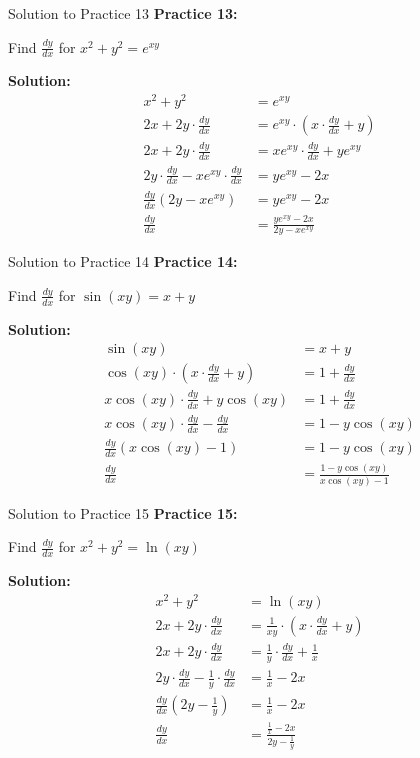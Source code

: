 \documentclass[aspectratio=169]{beamer}
\begin{document}
\begin{frame}{Solution to Practice 13}
\textbf{Practice 13:}

Find $\frac{dy}{dx}$ for $x^2 + y^2 = e^{xy}$

\textbf{Solution:}
\[
\begin{aligned}
  x^2 + y^2 &= e^{xy} \\
  2x + 2y \cdot \frac{dy}{dx} &= e^{xy} \cdot (x \cdot \frac{dy}{dx} + y) \\
  2x + 2y \cdot \frac{dy}{dx} &= xe^{xy} \cdot \frac{dy}{dx} + ye^{xy} \\
  2y \cdot \frac{dy}{dx} - xe^{xy} \cdot \frac{dy}{dx} &= ye^{xy} - 2x \\
  \frac{dy}{dx}(2y - xe^{xy}) &= ye^{xy} - 2x \\
  \frac{dy}{dx} &= \frac{ye^{xy} - 2x}{2y - xe^{xy}}
\end{aligned}
\]
\end{frame}

\begin{frame}{Solution to Practice 14}
\textbf{Practice 14:}

Find $\frac{dy}{dx}$ for $\sin(xy) = x + y$

\textbf{Solution:}
\[
\begin{aligned}
  \sin(xy) &= x + y \\
  \cos(xy) \cdot (x \cdot \frac{dy}{dx} + y) &= 1 + \frac{dy}{dx} \\
  x\cos(xy) \cdot \frac{dy}{dx} + y\cos(xy) &= 1 + \frac{dy}{dx} \\
  x\cos(xy) \cdot \frac{dy}{dx} - \frac{dy}{dx} &= 1 - y\cos(xy) \\
  \frac{dy}{dx}(x\cos(xy) - 1) &= 1 - y\cos(xy) \\
  \frac{dy}{dx} &= \frac{1 - y\cos(xy)}{x\cos(xy) - 1}
\end{aligned}
\]
\end{frame}

\begin{frame}{Solution to Practice 15}
\textbf{Practice 15:}

Find $\frac{dy}{dx}$ for $x^2 + y^2 = \ln(xy)$

\textbf{Solution:}
\[
\begin{aligned}
  x^2 + y^2 &= \ln(xy) \\
  2x + 2y \cdot \frac{dy}{dx} &= \frac{1}{xy} \cdot (x \cdot \frac{dy}{dx} + y) \\
  2x + 2y \cdot \frac{dy}{dx} &= \frac{1}{y} \cdot \frac{dy}{dx} + \frac{1}{x} \\
  2y \cdot \frac{dy}{dx} - \frac{1}{y} \cdot \frac{dy}{dx} &= \frac{1}{x} - 2x \\
  \frac{dy}{dx}(2y - \frac{1}{y}) &= \frac{1}{x} - 2x \\
  \frac{dy}{dx} &= \frac{\frac{1}{x} - 2x}{2y - \frac{1}{y}}
\end{aligned}
\]
\end{frame}
\end{document}
